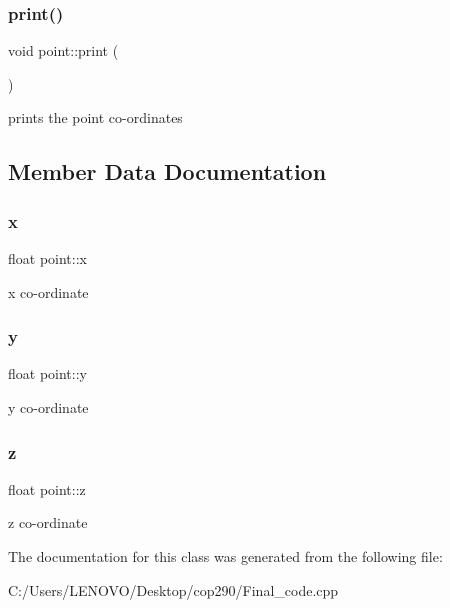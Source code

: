 \subsubsection{print()}
{\footnotesize\ttfamily void point\+::print (\begin{DoxyParamCaption}{ }\end{DoxyParamCaption})\hspace{0.3cm}{\ttfamily [inline]}}

prints the point co-\/ordinates 

\subsection{Member Data Documentation}
\mbox{\label{classpoint_a8293fd2de3ce739deb6d53691fd21fcf}} 
\subsubsection{x}
{\footnotesize\ttfamily float point\+::x}

x co-\/ordinate \mbox{\label{classpoint_a616ad85a2096d1566f5971666bbc3b3f}} 
\subsubsection{y}
{\footnotesize\ttfamily float point\+::y}

y co-\/ordinate \mbox{\label{classpoint_a3c15cf62431e51a4d9432ca40b3b04f5}} 
\subsubsection{z}
{\footnotesize\ttfamily float point\+::z}

z co-\/ordinate 

The documentation for this class was generated from the following file\+:\begin{DoxyCompactItemize}
\item 
C\+:/\+Users/\+L\+E\+N\+O\+V\+O/\+Desktop/cop290/Final\+\_\+code.\+cpp\end{DoxyCompactItemize}
